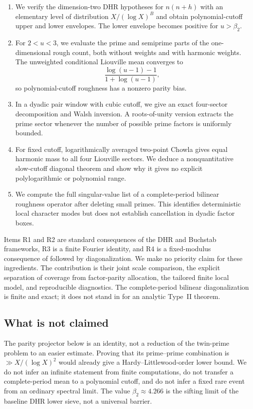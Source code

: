 \documentclass[11pt]{article}
\theoremstyle{definition}
\theoremstyle{remark}
\begin{document}
\begin{enumerate}[label=\textbf{R\arabic*.},leftmargin=3.2em]
 \item We verify the dimension-two DHR hypotheses for $n(n+h)$ with an elementary level of distribution $X/(\log X)^B$ and obtain polynomial-cutoff upper and lower envelopes.  The lower envelope becomes positive for $u>\beta_2$.
 \item For $2<u<3$, we evaluate the prime and semiprime parts of the one-dimensional rough count, both without weights and with harmonic weights.  The unweighted conditional Liouville mean converges to
 \[
  \frac{\log(u-1)-1}{1+\log(u-1)},
 \]
 so polynomial-cutoff roughness has a nonzero parity bias.
 \item In a dyadic pair window with cubic cutoff, we give an exact four-sector decomposition and Walsh inversion.  A roots-of-unity version extracts the prime sector whenever the number of possible prime factors is uniformly bounded.
 \item For fixed cutoff, logarithmically averaged two-point Chowla gives equal harmonic mass to all four Liouville sectors.  We deduce a nonquantitative slow-cutoff diagonal theorem and show why it gives no explicit polylogarithmic or polynomial range.
 \item We compute the full singular-value list of a complete-period bilinear roughness operator after deleting small primes.  This identifies deterministic local character modes but does not establish cancellation in dyadic factor boxes.
\end{enumerate}

Items R1 and R2 are standard consequences of the DHR and Buchstab frameworks, R3 is a finite Fourier identity, and R4 is a fixed-modulus consequence of \citet{Tao2016} followed by diagonalization.  We make no priority claim for these ingredients.  The contribution is their joint scale comparison, the explicit separation of coverage from factor-parity allocation, the tailored finite local model, and reproducible diagnostics.  The complete-period bilinear diagonalization is finite and exact; it does not stand in for an analytic Type~II theorem.

\subsection*{What is not claimed}

The parity projector below is an identity, not a reduction of the twin-prime problem to an easier estimate.  Proving that its prime--prime combination is $\gg X/(\log X)^2$ would already give a Hardy--Littlewood-order lower bound.  We do not infer an infinite statement from finite computations, do not transfer a complete-period mean to a polynomial cutoff, and do not infer a fixed rare event from an ordinary spectral limit.  The value $\beta_2\approx4.266$ is the sifting limit of the baseline DHR lower sieve, not a universal barrier.
\end{document}
